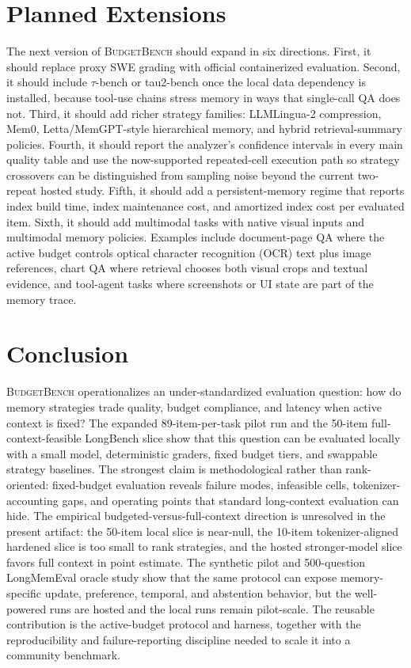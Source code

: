 \documentclass[11pt]{article}
\newcommand{\BudgetBench}{\textsc{BudgetBench}}
\begin{document}
\section{Planned Extensions}

The next version of \BudgetBench{} should expand in six directions.  First,
it should replace proxy SWE grading with official containerized evaluation.
Second, it should include $\tau$-bench or tau2-bench once the local data
dependency is installed, because tool-use chains stress memory in ways that
single-call QA does not.  Third, it should add richer strategy families:
LLMLingua-2 compression, Mem0, Letta/MemGPT-style hierarchical memory, and
hybrid retrieval-summary policies.  Fourth, it should report the analyzer's
confidence intervals in every main quality table and use the now-supported
repeated-cell execution path so strategy crossovers can be
distinguished from sampling noise beyond the current two-repeat hosted study.
Fifth, it should add a persistent-memory regime that reports index build time,
index maintenance cost, and amortized index cost per evaluated item.  Sixth,
it should add multimodal tasks with
native visual inputs and multimodal memory policies.  Examples include
document-page QA where the active
budget controls optical character recognition (OCR) text plus image references, chart QA where retrieval
chooses both visual crops and textual evidence, and tool-agent tasks where
screenshots or UI state are part of the memory trace.

\section{Conclusion}

\BudgetBench{} operationalizes an under-standardized evaluation
question: how do memory strategies trade quality, budget compliance, and
latency when active context is fixed?  The expanded 89-item-per-task pilot run
and the 50-item full-context-feasible LongBench slice show that this question
can be evaluated locally with a small model, deterministic graders, fixed
budget tiers, and swappable strategy baselines.  The strongest claim is
methodological rather than rank-oriented: fixed-budget evaluation reveals
failure modes, infeasible cells, tokenizer-accounting gaps, and operating
points that standard long-context evaluation can hide.  The empirical
budgeted-versus-full-context direction is unresolved in the present artifact:
the 50-item local slice is near-null, the 10-item tokenizer-aligned hardened
slice is too small to rank strategies, and the hosted stronger-model slice
favors full context in point estimate.  The synthetic pilot and 500-question
LongMemEval oracle study show that the same protocol can expose
memory-specific update, preference, temporal, and abstention behavior, but the
well-powered runs are hosted and the local runs remain pilot-scale.  The
reusable contribution is the active-budget protocol and harness, together with
the reproducibility and failure-reporting discipline needed to scale it into a
community benchmark.
\end{document}

